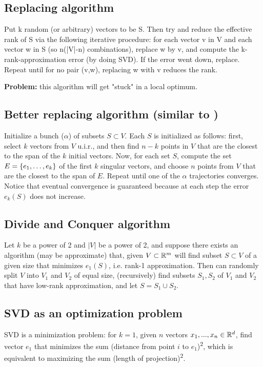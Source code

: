 \documentclass{article}
\begin{document}
\subsection{Replacing algorithm}
Put k random (or arbitrary) vectors to be S. Then try and reduce the effective rank of S via the following iterative procedure: for each vector v in V and each vector w in S (so n(|V|-n) combinations), replace w by v, and compute the k-rank-approximation error (by doing SVD). If the error went down, replace. Repeat until for no pair (v,w), replacing w with v reduces the rank.

\textbf{Problem:} this algorithm will get "stuck" in a local optimum.

\subsection{Better replacing algorithm (similar to \cite{rousseeuw1999fast})}
Initialize a bunch ($\alpha$) of subsets $S\subset V$. Each $S$ is initialized as follows: first, select $k$ vectors from $V$ u.i.r., and then find $n-k$ points in $V$ that are the closest to the span of the $k$ initial vectors. Now, for each set $S$, compute the set $E = \left\{e_1,\dots, e_k\right\}$ of the first $k$ singular vectors, and choose $n$ points from $V$ that are the closest to the span of $E$. Repeat until one of the $\alpha$ trajectories converges. Notice that eventual convergence is guaranteed because at each step the error $e_k(S)$ does not increase.

\subsection{Divide and Conquer algorithm}
Let $k$ be a power of 2 and $|V|$ be a power of 2, and suppose there exists an algorithm (may be approximate) that, given $V\subset \mathbb{R}^m$ will find subset $S\subset V$ of a given size that minimizes $e_1(S)$, i.e. rank-1 approximation. Then can randomly split $V$ into $V_1$ and $V_2$ of equal size, (recursively) find subsets $S_1,S_2$ of $V_1$ and $V_2$ that have low-rank approximation, and let $S = S_1\cup S_2$.

\subsection{SVD as an optimization problem}
SVD is a minimization problem: for $k=1$, given $n$ vectors $x_1,...,x_n\in \mathbb{R}^d$, find vector $e_1$ that minimizes the sum (distance from point $i$ to $e_1$)\textsuperscript{2}, which is equivalent to maximizing the sum (length of projection)\textsuperscript{2}.
\end{document}

